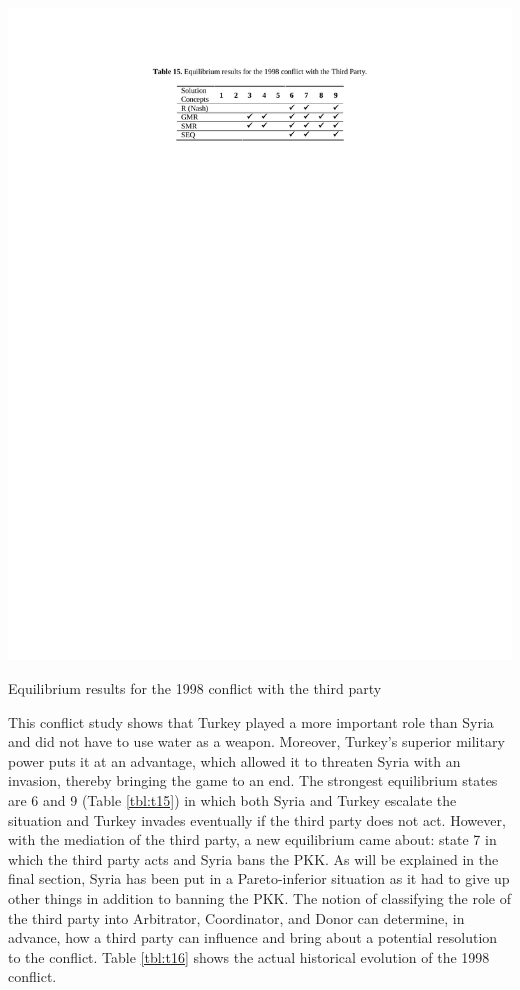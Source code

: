 \documentclass[letterpaper,12pt,titlepage,oneside,final]{book}
\begin{document}
\begin{table}[H]
\centering
\includegraphics[scale=1]{PDF-IMG/tables/15.pdf}

\caption{Equilibrium results for the 1998 conflict with the third party}

\label{tbl:t15}
\end{table}

This conflict study shows that Turkey played a more important role than Syria and did not have to use water as a weapon. Moreover, Turkey's superior military power puts it at an advantage, which allowed it to threaten Syria with an invasion, thereby bringing the game to an end. The strongest equilibrium states are 6 and 9 (Table \ref{tbl:t15}) in which both Syria and Turkey escalate the situation and Turkey invades eventually if the third party does not act. However, with the mediation of the third party, a new equilibrium came about: state 7 in which the third party acts and Syria bans the PKK. As will be explained in the final section, Syria has been put in a Pareto-inferior situation as it had to give up other things in addition to banning the PKK.
The notion of classifying the role of the third party into Arbitrator, Coordinator, and Donor can determine, in advance, how a third party can influence and bring about a potential resolution to the conflict. Table \ref{tbl:t16} shows the actual historical evolution of the 1998 conflict. 
\end{document}
